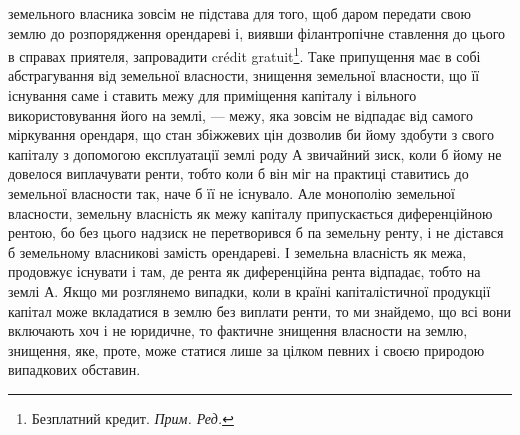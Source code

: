\parcont{}  %
земельного власника зовсім не підстава для того, щоб даром передати свою землю
до розпорядження орендареві і, виявши філантропічне ставлення до цього в
справах приятеля, запровадити crédit gratuit\footnote*{
Безплатний кредит. \emph{Прим. Ред.}
}. Таке припущення має в собі
абстрагування від земельної власности, знищення земельної власности, що її
існування саме і ставить межу для приміщення капіталу і вільного використовування
його на землі, — межу, яка зовсім не відпадає від самого міркування
орендаря, що стан збіжжевих цін дозволив би йому здобути з свого
капіталу з допомогою експлуатації землі роду $А$ звичайний зиск, коли б йому
не довелося виплачувати ренти, тобто коли б він міг на практиці ставитись до
земельної власности так, наче б її не існувало. Але монополію земельної власности,
земельну власність як межу капіталу припускається диференційною
рентою, бо без цього надзиск не перетворився б па земельну ренту, і не дістався
б земельному власникові замість орендареві. І земельна власність як межа,
продовжує існувати і там, де рента як диференційна рента відпадає, тобто на
землі $А$. Якщо ми розглянемо випадки, коли в країні капіталістичної продукції
капітал може вкладатися в землю без виплати ренти, то ми знайдемо, що всі
вони включають хоч і не юридичне, то фактичне знищення власности на землю,
знищення, яке, проте, може статися лише за цілком певних і своєю природою
випадкових обставин.

